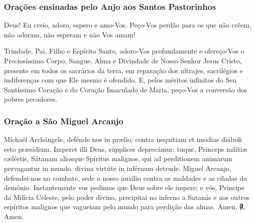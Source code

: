 \subsubsection{Orações ensinadas pelo Anjo aos Santos Pastorinhos}
\begin{nscenter}
{}
\end{nscenter}

 Deus! Eu creio, adoro, espero e amo-Vos. Peço-Vos perdão para os que não crêem, não adoram, não esperam e não Vos amam!

\emph{}

\begin{nscenter}
{}
\end{nscenter}

 Trindade, Pai, Filho e Espírito Santo, adoro-Vos profundamente e ofereço-Vos o Preciosíssimo Corpo, Sangue, Alma e Divindade de Nosso Senhor Jesus Cristo, presente em todos os sacrários da terra, em reparação dos ultrajes, sacrilégios e indiferenças com que Ele mesmo é ofendido. E, pelos méritos infinitos do Seu Santíssimo Coração e do Coração Imaculado de Maria, peço-Vos a conversão dos pobres pecadores.

\emph{}

\subsubsection{Oração a São Miguel Arcanjo}
\begin{paracol}{2}
 Míchaël Archángele, defénde nos in prælio; contra nequitiam et insidias diáboli esto præsídium. Imperet illi Deus, súpplices deprecámur: tuque, Princeps milítiæ cæléstis, Sátanam aliosque Spíritus malignos, qui ad perditionem animarum pervagantur in mundo, divina virtúte in inférnum detrude.
\switchcolumn
{} Miguel Arcanjo, defendei-nos no combate, sede o nosso auxílio contra as maldades e as ciladas do demónio. Instantemente vos pedimos que Deus sobre ele impere; e vós, Príncipe da Milícia Celeste, pelo poder divino, precipitai no inferno a Satanás e aos outros espíritos malignos que vagueiam pelo mundo para perdição das almas.
 Amen.
\switchcolumn
{\redx ℟.} Amen.
\end{paracol}

